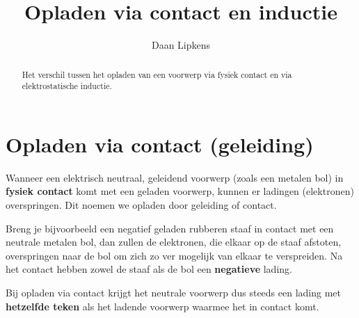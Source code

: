 \documentclass{ximera}
\title{Opladen via contact en inductie}
\author{Daan Lipkens}
\begin{document}
\begin{abstract}
    Het verschil tussen het opladen van een voorwerp via fysiek contact en via elektrostatische inductie.
\end{abstract}
\maketitle

\section{Opladen via contact (geleiding)}
Wanneer een elektrisch neutraal, geleidend voorwerp (zoals een metalen bol) in \textbf{fysiek contact} komt met een geladen voorwerp, kunnen er ladingen (elektronen) overspringen. Dit noemen we opladen door geleiding of contact.

Breng je bijvoorbeeld een negatief geladen rubberen staaf in contact met een neutrale metalen bol, dan zullen de elektronen, die elkaar op de staaf afstoten, overspringen naar de bol om zich zo ver mogelijk van elkaar te verspreiden. Na het contact hebben zowel de staaf als de bol een \textbf{negatieve} lading.

Bij opladen via contact krijgt het neutrale voorwerp dus steeds een lading met \textbf{hetzelfde teken} als het ladende voorwerp waarmee het in contact komt.
\end{document}
